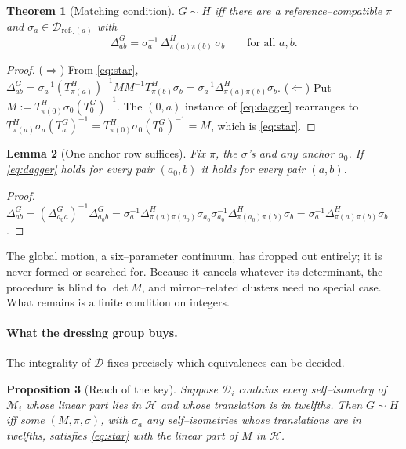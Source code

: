 \documentclass[11pt]{article}
\newtheorem{theorem}{Theorem}
\newtheorem{proposition}[theorem]{Proposition}
\newtheorem{lemma}[theorem]{Lemma}
\theoremstyle{definition}
\newcommand{\Hgrp}{\mathcal{H}}
\newcommand{\Dgrp}{\mathcal{D}}
\newcommand{\inv}{^{-1}}
\begin{document}
\begin{theorem}[Matching condition]\label{thm:match}
$G\sim H$ iff there are a reference--compatible $\pi$ and
$\sigma_a\in\Dgrp_{\mathrm{ref}_G(a)}$ with
\begin{equation}\label{eq:dagger}
  \Delta^G_{ab}=\sigma_a\inv\,\Delta^H_{\pi(a)\pi(b)}\,\sigma_b
  \qquad\text{for all }a,b. \tag{$\dagger$}
\end{equation}
\end{theorem}

\begin{proof}
($\Rightarrow$) From \eqref{eq:star},
$\Delta^G_{ab}=\sigma_a\inv(T^H_{\pi(a)})\inv MM\inv T^H_{\pi(b)}\sigma_b
=\sigma_a\inv\Delta^H_{\pi(a)\pi(b)}\sigma_b$.
($\Leftarrow$) Put $M:=T^H_{\pi(0)}\sigma_0(T^G_0)\inv$. The $(0,a)$ instance of
\eqref{eq:dagger} rearranges to
$T^H_{\pi(a)}\sigma_a(T^G_a)\inv=T^H_{\pi(0)}\sigma_0(T^G_0)\inv=M$, which is
\eqref{eq:star}.
\end{proof}

\begin{lemma}[One anchor row suffices]\label{lem:row}
Fix $\pi$, the $\sigma$'s and any anchor $a_0$. If \eqref{eq:dagger} holds for
every pair $(a_0,b)$ it holds for every pair $(a,b)$.
\end{lemma}

\begin{proof}
$\Delta^G_{ab}=(\Delta^G_{a_0a})\inv\Delta^G_{a_0b}
=\sigma_a\inv\Delta^H_{\pi(a)\pi(a_0)}\sigma_{a_0}\sigma_{a_0}\inv
\Delta^H_{\pi(a_0)\pi(b)}\sigma_b=\sigma_a\inv\Delta^H_{\pi(a)\pi(b)}\sigma_b$.
\end{proof}

The global motion, a six--parameter continuum, has dropped out entirely; it is
never formed or searched for. Because it cancels whatever its determinant, the
procedure is blind to $\det M$, and mirror--related clusters need no special case.
What remains is a finite condition on integers.

\paragraph{What the dressing group buys.}
The integrality of $\Dgrp$ fixes precisely which equivalences can be decided.

\begin{proposition}[Reach of the key]\label{prop:reach}
Suppose $\Dgrp_i$ contains every self--isometry of $\mathcal{M}_i$ whose linear
part lies in $\Hgrp$ and whose translation is in twelfths. Then $G\sim H$ iff some
$(M,\pi,\sigma)$, with $\sigma_a$ any self--isometries whose translations are
in twelfths, satisfies \eqref{eq:star} with the linear part of $M$ in $\Hgrp$.
\end{proposition}
\end{document}
